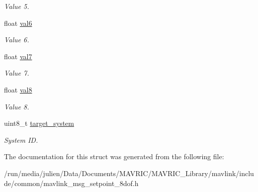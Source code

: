 \begin{DoxyCompactItemize}
\begin{DoxyCompactList}\small\item\em Value 5. \end{DoxyCompactList}\item 
\hypertarget{struct____mavlink__setpoint__8dof__t_ab594c3d6053d7163549a8f7b56275268}{float \hyperlink{struct____mavlink__setpoint__8dof__t_ab594c3d6053d7163549a8f7b56275268}{val6}}\label{struct____mavlink__setpoint__8dof__t_ab594c3d6053d7163549a8f7b56275268}

\begin{DoxyCompactList}\small\item\em Value 6. \end{DoxyCompactList}\item 
\hypertarget{struct____mavlink__setpoint__8dof__t_a72aa1e1288535faff87b5e9cbc03c6bb}{float \hyperlink{struct____mavlink__setpoint__8dof__t_a72aa1e1288535faff87b5e9cbc03c6bb}{val7}}\label{struct____mavlink__setpoint__8dof__t_a72aa1e1288535faff87b5e9cbc03c6bb}

\begin{DoxyCompactList}\small\item\em Value 7. \end{DoxyCompactList}\item 
\hypertarget{struct____mavlink__setpoint__8dof__t_a65d17130db8869b8b3ec499dea3f832e}{float \hyperlink{struct____mavlink__setpoint__8dof__t_a65d17130db8869b8b3ec499dea3f832e}{val8}}\label{struct____mavlink__setpoint__8dof__t_a65d17130db8869b8b3ec499dea3f832e}

\begin{DoxyCompactList}\small\item\em Value 8. \end{DoxyCompactList}\item 
\hypertarget{struct____mavlink__setpoint__8dof__t_a2c502096f2c527803be3045755604878}{uint8\+\_\+t \hyperlink{struct____mavlink__setpoint__8dof__t_a2c502096f2c527803be3045755604878}{target\+\_\+system}}\label{struct____mavlink__setpoint__8dof__t_a2c502096f2c527803be3045755604878}

\begin{DoxyCompactList}\small\item\em System I\+D. \end{DoxyCompactList}\end{DoxyCompactItemize}


The documentation for this struct was generated from the following file\+:\begin{DoxyCompactItemize}
\item 
/run/media/julien/\+Data/\+Documents/\+M\+A\+V\+R\+I\+C/\+M\+A\+V\+R\+I\+C\+\_\+\+Library/mavlink/include/common/mavlink\+\_\+msg\+\_\+setpoint\+\_\+8dof.\+h\end{DoxyCompactItemize}

